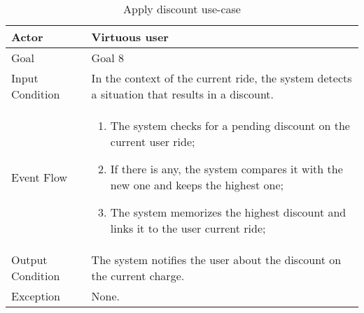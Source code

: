 \begin{table}[H]
\begin{center}
\begin{tabular}{p{} | p{}}
\hline
Actor & Virtuous user\\
\hline
Goal & Goal 8\\
\hline
Input Condition & In the context of the current ride, the system detects a situation that results in a discount.\\
\hline
Event Flow & 
\begin{enumerate}
\item The system checks for a pending discount on the current user ride;
\item If there is any, the system compares it with the new one and keeps the highest one;
\item The system memorizes the highest discount and links it to the user current ride;
\end{enumerate} \\
\hline
Output Condition & The system notifies the user about the discount on the current charge.\\
\hline
Exception & None.\\
\hline
\end{tabular}
\end{center}
\caption{Apply discount use-case}
\label{apply_discounts_uc}
\end{table}